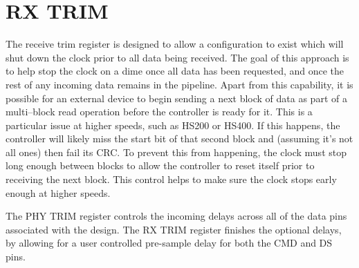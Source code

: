 \documentclass{gqtekspec}
\begin{document}
\section{RX TRIM}
The receive trim register is designed to allow a configuration to exist which
will shut down the clock prior to all data being received.  The goal of this
approach is to help stop the clock on a dime once all data has been requested,
and once the rest of any incoming data remains in the pipeline.
Apart from this capability, it is possible for an external device to begin
sending a next block of data as part of a multi--block read operation before
the controller is ready for it.  This is a particular issue at higher speeds,
such as HS200 or HS400.  If this happens, the controller will likely miss the
start bit of that second block and (assuming it's not all ones) then fail its
CRC.  To prevent this from happening, the clock must stop long enough between
blocks to allow the controller to reset itself prior to receiving the next
block.  This control helps to make sure the clock stops early enough at
higher speeds.

The PHY TRIM register controls the incoming delays across all of the data pins
associated with the design.  The RX TRIM register finishes the optional
delays, by allowing for a user controlled pre-sample delay for both the CMD
and DS pins.
\end{document}
